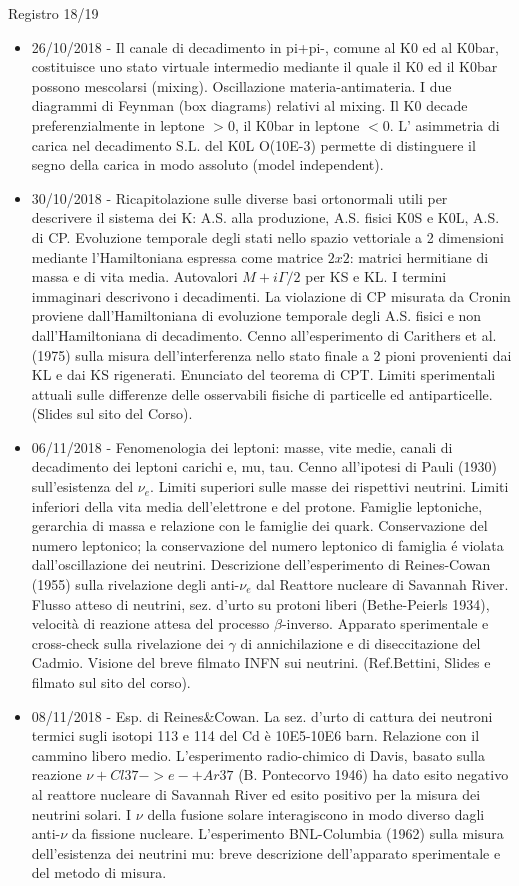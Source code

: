 \begin{frame}[allowframebreaks]{Registro 18/19}
\begin{itemize}
\item 26/10/2018 - Il canale di decadimento in pi+pi-, comune al K0 ed al K0bar, costituisce uno stato virtuale intermedio mediante il quale il K0 ed il K0bar possono mescolarsi (mixing). Oscillazione materia-antimateria. I due diagrammi di Feynman (box diagrams) relativi al mixing. Il K0 decade preferenzialmente in leptone $>0$, il K0bar in leptone $<0$. L' asimmetria di carica nel decadimento S.L. del K0L O(10E-3) permette di distinguere il segno della carica in modo assoluto (model independent).
\item 30/10/2018 - Ricapitolazione sulle diverse basi ortonormali utili per descrivere il sistema dei K: A.S. alla produzione, A.S. fisici K0S e K0L, A.S. di CP. Evoluzione temporale degli stati nello spazio vettoriale a 2 dimensioni mediante l'Hamiltoniana espressa come matrice $2x2$: matrici hermitiane di massa e di vita media. Autovalori $M+i\Gamma/2$ per KS e KL. I termini immaginari descrivono i decadimenti. La violazione di CP misurata da Cronin proviene dall'Hamiltoniana di evoluzione temporale degli A.S. fisici e non dall'Hamiltoniana di decadimento. Cenno all'esperimento di Carithers et al.(1975) sulla misura dell'interferenza nello stato finale a 2 pioni provenienti dai KL e dai KS rigenerati. Enunciato del teorema di CPT. Limiti sperimentali attuali sulle differenze delle osservabili fisiche di particelle ed antiparticelle. (Slides sul sito del Corso).
\item 06/11/2018 - Fenomenologia dei leptoni: masse, vite medie, canali di decadimento dei leptoni carichi e, mu, tau. Cenno all'ipotesi di Pauli (1930) sull'esistenza del $\nu_e$. Limiti superiori sulle masse dei rispettivi neutrini. Limiti inferiori della vita media dell'elettrone e del protone. Famiglie leptoniche, gerarchia di massa e relazione con le famiglie dei quark. Conservazione del numero leptonico; la conservazione del numero leptonico di famiglia \'e violata dall'oscillazione dei neutrini. Descrizione dell'esperimento di Reines-Cowan (1955) sulla rivelazione degli anti-$\nu_e$ dal Reattore nucleare di Savannah River. Flusso atteso di neutrini, sez. d'urto su protoni liberi (Bethe-Peierls 1934), velocità di reazione attesa del processo $\beta$-inverso. Apparato sperimentale e cross-check sulla rivelazione dei $\gamma$ di annichilazione e di diseccitazione del Cadmio. Visione del breve filmato INFN sui neutrini. (Ref.Bettini, Slides e filmato sul sito del corso).
\item 08/11/2018 - Esp. di Reines\&Cowan. La sez. d'urto di cattura dei neutroni termici sugli isotopi 113 e 114 del Cd è 10E5-10E6 barn. Relazione con il cammino libero medio. L'esperimento radio-chimico di Davis, basato sulla reazione $\nu+Cl37->e- + Ar37$ (B. Pontecorvo 1946) ha dato esito negativo al reattore nucleare di Savannah River ed esito positivo per la misura dei neutrini solari. I $\nu$ della fusione solare interagiscono in modo diverso dagli anti-$\nu$ da fissione nucleare. L'esperimento BNL-Columbia (1962) sulla misura dell'esistenza dei neutrini mu: breve descrizione dell'apparato sperimentale e del metodo di misura.

\end{itemize}
\end{frame}
